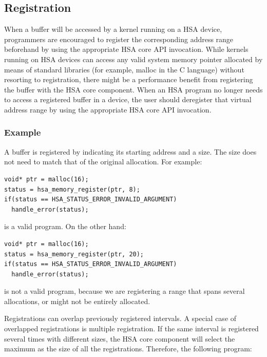 \documentclass[draft]{book}
\begin{document}
\hypertarget{memory-registration}{}\subsection{Registration}\label{memory-registration}

When a buffer will be accessed by a kernel running on a HSA device, programmers
are encouraged to register the corresponding address range beforehand by using
the appropriate HSA core API invocation. While kernels running on HSA devices
can access any valid system memory pointer allocated by means of standard
libraries (for example, malloc in the C language) without resorting to
registration, there might be a performance benefit from registering the buffer
with the HSA core component. When an HSA program no longer needs to access a
registered buffer in a device, the user should deregister that virtual address
range by using the appropriate HSA core API invocation.



\hypertarget{registration-usage}{}\subsubsection{Example}\label{registration-usage}

A buffer is registered by indicating its starting address and a size. The size
does not need to match that of the original allocation. For example:

\begin{lstlisting}
void* ptr = malloc(16);
status = hsa_memory_register(ptr, 8);
if(status == HSA_STATUS_ERROR_INVALID_ARGUMENT)
  handle_error(status);
\end{lstlisting}

 is a valid program. On the other hand:

\begin{lstlisting}
void* ptr = malloc(16);
status = hsa_memory_register(ptr, 20);
if(status == HSA_STATUS_ERROR_INVALID_ARGUMENT)
  handle_error(status);
\end{lstlisting}

is not a valid program, because we are registering a range that spans several
allocations, or might not be entirely allocated.

Registrations can overlap previously registered intervals. A special case of
overlapped registrations is multiple registration. If the same interval is
registered several times with different sizes, the HSA core component will
select the maximum as the size of all the registrations. Therefore, the
following program:
\end{document}
